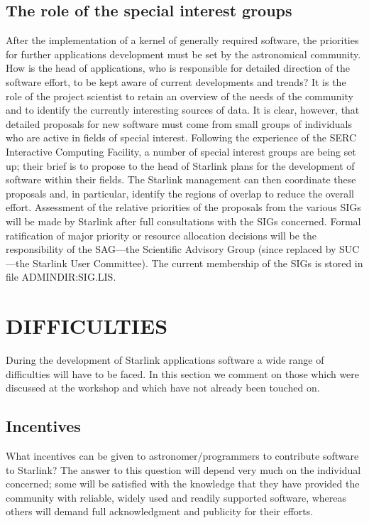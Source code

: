 \subsection {The role of the special interest groups}
After the implementation of a kernel of generally required software, the
priorities for further applications development must be set by the astronomical
community.
How is the head of applications, who is responsible for detailed direction of
the software effort, to be kept aware of current developments and trends?
It is the role of the project scientist to retain an overview of the needs of
the community and to identify the currently interesting sources of data.
It is clear, however, that detailed proposals for new software must come from
small groups of individuals who are active in fields of special interest.
Following the experience of the SERC Interactive Computing Facility, a number of
special interest groups are being set up; their brief is to propose to the
head of Starlink plans for the development of software within their fields.
The Starlink management can then coordinate these proposals and, in particular,
identify the regions of overlap to reduce the overall effort.
Assessment of the relative priorities of the proposals from the various
SIGs will be made by Starlink after full consultations with the SIGs concerned.
Formal ratification of major priority or resource allocation decisions will be
the responsibility of the SAG---the Scientific Advisory Group (since replaced
by SUC---the Starlink User Committee).
The current membership of the SIGs is stored in file ADMINDIR:SIG.LIS.
\section {DIFFICULTIES}
During the development of Starlink applications software a wide range of
difficulties will have to be faced.
In this section we comment on those which were discussed at the workshop and
which have not already been touched on.
\subsection {Incentives}
What incentives can be given to astronomer/programmers to contribute software to
Starlink?
The answer to this question will depend very much on the individual concerned;
some will be satisfied with the knowledge that they have provided the community
with reliable, widely used and readily supported software, whereas others will
demand full acknowledgment and publicity for their efforts.

